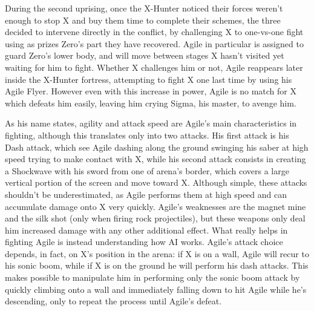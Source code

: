 During the second uprising, once the X-Hunter noticed their forces weren't enough to stop X and buy them time to complete their schemes, the three decided to intervene directly in the conflict, by challenging X to one-vs-one fight using as prizes Zero's part they have recovered. Agile in particular is assigned to guard Zero's lower body, and will move between stages X hasn't visited yet waiting for him to fight. Whether X challenges him or not, Agile reappears later inside the X-Hunter fortress, attempting to fight X one last time by using his Agile Flyer. However even with this increase in power, Agile is no match for X which defeats him easily, leaving him crying Sigma, his master, to avenge him.

As his name states, agility and attack speed are Agile's main characteristics in fighting, although this translates only into two attacks. His first attack is his Dash attack, which see Agile dashing along the ground swinging his saber at high speed trying to make contact with X, while his second attack consists in creating a Shockwave with his sword from one of arena's border, which covers a large vertical portion of the screen and move toward X. Although simple, these attacks shouldn't be underestimated, as Agile performs them at high speed and can accumulate damage onto X very quickly. Agile's weaknesses are the magnet mine and the silk shot (only when firing rock projectiles), but these weapons only deal him increased damage with any other additional effect. What really helps in fighting Agile is instead understanding how AI works. Agile's attack choice depends, in fact, on  X's position in the arena: if X is on a wall, Agile will recur to his sonic boom, while if X is on the ground he will perform his dash attacks. This makes possible to manipulate him in performing only the sonic boom attack by quickly climbing onto a wall and immediately falling down to hit Agile while he's descending, only to repeat the process until Agile's defeat.
